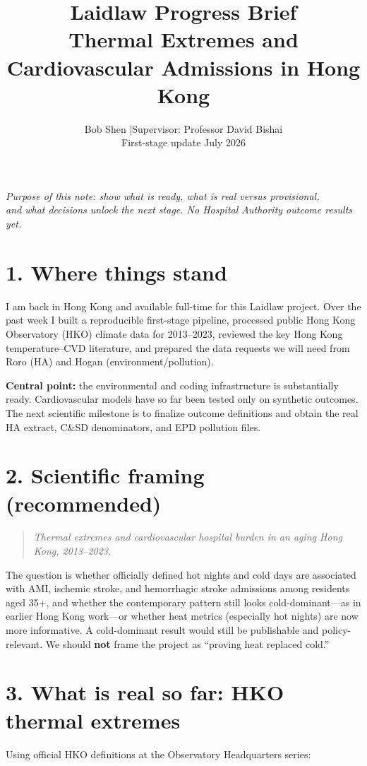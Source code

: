 \documentclass[11pt]{article}
\title{\vspace{-1.2em}\textbf{Laidlaw Progress Brief}\\[0.35em]
\large Thermal Extremes and Cardiovascular Admissions in Hong Kong}
\author{Bob Shen \quad|\quad Supervisor: Professor David Bishai\\
\small First-stage update \quad 10 July 2026}
\date{}
\begin{document}
\maketitle
\vspace{-1.5em}

\begin{center}
\textit{Purpose of this note: show what is ready, what is real versus provisional,\\
and what decisions unlock the next stage. No Hospital Authority outcome results yet.}
\end{center}

\section*{1. Where things stand}
I am back in Hong Kong and available full-time for this Laidlaw project. Over the past week I built a reproducible first-stage pipeline, processed public Hong Kong Observatory (HKO) climate data for 2013--2023, reviewed the key Hong Kong temperature--CVD literature, and prepared the data requests we will need from Roro (HA) and Hogan (environment/pollution).

\textbf{Central point:} the environmental and coding infrastructure is substantially ready. Cardiovascular models have so far been tested only on synthetic outcomes. The next scientific milestone is to finalize outcome definitions and obtain the real HA extract, C\&SD denominators, and EPD pollution files.

\section*{2. Scientific framing (recommended)}
\begin{quote}
\textit{Thermal extremes and cardiovascular hospital burden in an aging Hong Kong, 2013--2023.}
\end{quote}
The question is whether officially defined hot nights and cold days are associated with AMI, ischemic stroke, and hemorrhagic stroke admissions among residents aged 35+, and whether the contemporary pattern still looks cold-dominant---as in earlier Hong Kong work---or whether heat metrics (especially hot nights) are now more informative. A cold-dominant result would still be publishable and policy-relevant. We should \textbf{not} frame the project as ``proving heat replaced cold.''

\section*{3. What is real so far: HKO thermal extremes}
Using official HKO definitions at the Observatory Headquarters series:
\end{document}
